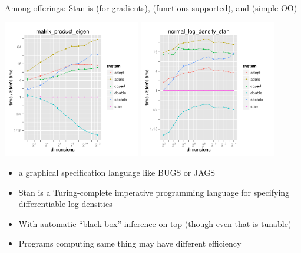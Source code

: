 \documentclass[10pt]{report}
\begin{document}
\begin{subitemize}
\item Among  offerings:
Stan is  (for gradients),
 (functions supported),
and  (simple OO)
\end{subitemize}
\vspace*{-8pt}
\hfill
\includegraphics[width=0.45\textwidth]{img/autodiff-eval-matrix-product-eigen.pdf}
\hfill
\includegraphics[width=0.45\textwidth]{img/autodiff-eval-normal-density.pdf}
\hfill





%
\begin{itemize}
\item {} a graphical specification language like BUGS or JAGS
\item Stan is a Turing-complete imperative programming language for specifying differentiable log densities
\item With automatic ``black-box'' inference on top (though even that is tunable)
\item Programs computing same thing may have different efficiency
\end{itemize}
\end{document}
